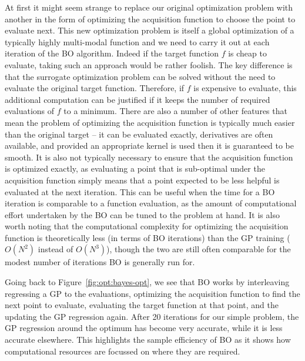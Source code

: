 At first it might seem strange to replace our original optimization problem with
another in the form of optimizing the acquisition function to choose the point
to evaluate next.  This new optimization problem is itself a global
optimization of a typically highly multi-modal function and we need to carry it out
at each iteration of the BO algorithm.  Indeed if the target function $f$ is cheap to
evaluate, taking such an approach would be rather foolish.
The key difference
is that the surrogate optimization problem can be solved without the need to evaluate
the original target function.  Therefore, if $f$ is expensive to evaluate, this additional
computation can be justified if it keeps the number of required evaluations of $f$ to
a minimum.  There are also a number of other features that mean the problem of
optimizing the acquisition function is typically much easier than the original target --
it can be evaluated exactly, derivatives are often available, and provided an appropriate kernel
is used then it is guaranteed to be smooth.  It is also not typically necessary to ensure
that the acquisition function is optimized exactly, as evaluating a point that is
sub-optimal under the acquisition function simply means that a point expected to be less
helpful is evaluated at the next iteration.  This can be useful when the time for a BO
iteration is comparable to a function evaluation, as the amount of computational effort
undertaken by the BO can be tuned to the problem at hand.  It is also worth noting that
the computational complexity for optimizing the acquisition function is theoretically less
(in terms of BO iterations) than the GP training ($O(N^2)$ instead of $O(N^3)$), though the two
are still often comparable for the modest number of iterations BO is
generally run for.

Going back to Figure~\ref{fig:opt:bayes-opt}, we see that BO works by interleaving
regressing a GP to the evaluations, optimizing the acquisition function to find the next
point to evaluate, evaluating the target function at that point, and the updating the GP
regression again.  After 20 iterations for our simple problem, the GP regression around
the optimum has become very accurate, while it is less accurate elsewhere.  This
highlights the sample efficiency of BO as it shows how computational resources are
focussed on where they are required.

